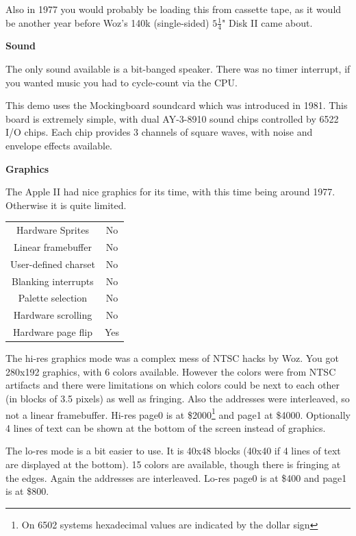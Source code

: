 \documentclass[twocolumn]{article}
\begin{document}
	Also in 1977 you would probably be loading this from cassette tape, as
	it would be another year before Woz's 140k (single-sided)
	$5\frac{1}{4}$" Disk II came about.
	
	{\bf Sound}

	The only sound available is a bit-banged speaker.
	There was no timer interrupt,
	if you wanted music you had to cycle-count via the CPU.

	This demo uses the Mockingboard soundcard which was introduced in
	1981.  This board is extremely simple, with dual AY-3-8910 sound
	chips controlled by 6522 I/O chips.
	Each chip provides 3 channels of square waves, with noise and
	envelope effects available.

	{\bf Graphics}

	The Apple II had nice graphics for its time, with this time being
	around 1977.  Otherwise it is quite limited.

	\begin{center}
	\begin{tabular}{|c|c|}
	\hline
	Hardware Sprites     &	No \\
	Linear framebuffer   &	No \\
	User-defined charset &	No \\
	Blanking interrupts  &	No \\
	Palette selection    &	No \\
	Hardware scrolling   &	No \\
	Hardware page flip   &	Yes \\
	\hline
	\end{tabular}
	\end{center}

	The hi-res graphics mode was a complex mess of NTSC hacks by Woz.
	You got 280x192 graphics, with 6 colors available.  However the colors
	were from NTSC artifacts and there were limitations on which colors
	could be next to each other (in blocks of 3.5 pixels) as well as
	fringing.  Also the addresses were interleaved, so not a linear
	framebuffer.  Hi-res page0 is at
	\$2000\footnote{On 6502 systems hexadecimal values are 
	indicated by the dollar sign}
	 and page1 at \$4000.
	Optionally 4 lines of text can be shown at the bottom of the
	screen instead of graphics.

	The lo-res mode is a bit easier to use.  It is 40x48 blocks
	(40x40 if 4 lines of text are displayed at the bottom).
	15 colors are available, though there is fringing at the edges.
	Again the addresses are interleaved.  Lo-res page0 is at \$400
	and page1 is at \$800.
\end{document}
